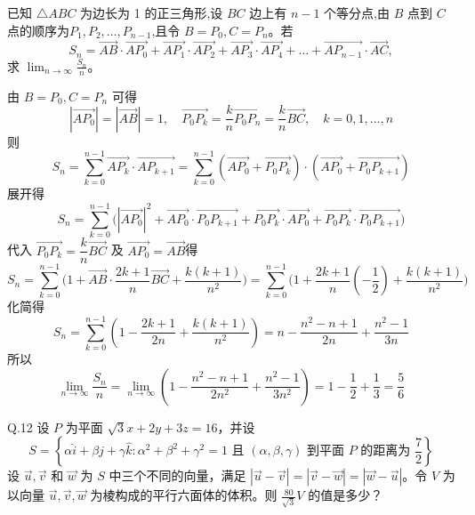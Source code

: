 \begin{questions}
    \question 已知 $\triangle ABC$ 为边长为 1 的正三角形,设 $BC$ 边上有 $n-1$ 个等分点,由 $B$ 点到 $C$ 点的顺序为$P_1, P_2, \dots, P_{n-1}$,且令 $B=P_0, C=P_n$。若
    \[
    S_n = \overrightarrow{AB} \cdot \overrightarrow{AP_0} + \overrightarrow{AP_1} \cdot \overrightarrow{AP_2} + \overrightarrow{AP_3} \cdot \overrightarrow{AP_4} + \dots + \overrightarrow{AP_{n-1}} \cdot \overrightarrow{AC},
    \]
    求 $\displaystyle \lim_{n \to \infty} \frac{S_n}{n}$。
    \begin{solution}
        由 $B=P_0, C=P_n$ 可得
        \[
        |\overrightarrow{AP_0}| = |\overrightarrow{AB}| =1, \quad 
        \overrightarrow{P_0P_k} = \frac{k}{n} \overrightarrow{P_0P_n} = \frac{k}{n}\overrightarrow{BC}, \quad k=0,1,\dots,n
        \]
        则
        \[
        S_n = \sum_{k=0}^{n-1} \overrightarrow{AP_k} \cdot \overrightarrow{AP_{k+1}}
        = \sum_{k=0}^{n-1} (\overrightarrow{AP_0} + \overrightarrow{P_0P_k}) \cdot (\overrightarrow{AP_0} + \overrightarrow{P_0P_{k+1}})
        \]
        展开得
        \[
        S_n = \sum_{k=0}^{n-1} \Big( |\overrightarrow{AP_0}|^2 + \overrightarrow{AP_0} \cdot \overrightarrow{P_0P_{k+1}} + \overrightarrow{P_0P_k} \cdot \overrightarrow{AP_0} + \overrightarrow{P_0P_k} \cdot \overrightarrow{P_0P_{k+1}} \Big)
        \]
        代入 $\overrightarrow{P_0P_k} = \dfrac{k}{n} \overrightarrow{BC}$ 及 $\overrightarrow{AP_0} = \overrightarrow{AB}$得
        \[
        S_n = \sum_{k=0}^{n-1} \Big( 1 + \overrightarrow{AB} \cdot \frac{2k+1}{n} \overrightarrow{BC} + \frac{k(k+1)}{n^2} \Big)
        = \sum_{k=0}^{n-1} \Big( 1 + \frac{2k+1}{n}\left(-\frac{1}{2}\right) + \frac{k(k+1)}{n^2} \Big)
        \]
        化简得
        \[
        S_n = \sum_{k=0}^{n-1} \left(1 - \frac{2k+1}{2n} + \frac{k(k+1)}{n^2}\right)
        = n - \frac{n^2 - n +1}{2n} + \frac{n^2 -1}{3n}
        \]
        所以
        \[
        \lim_{n \to \infty} \frac{S_n}{n} = \lim_{n \to \infty} \left( 1 - \frac{n^2 - n +1}{2n^2} + \frac{n^2 -1}{3n^2} \right)
        = 1 - \frac{1}{2} + \frac{1}{3} = \frac{5}{6}
        \]
    \end{solution}
    \question
Q.12 设 $P$ 为平面 $\sqrt{3}x + 2y + 3z = 16$，并设
\[ S = \left\{ \alpha \hat{i} + \beta \hat{j} + \gamma \hat{k} : \alpha^2 + \beta^2 + \gamma^2 = 1 \text{ 且 } (\alpha, \beta, \gamma) \text{ 到平面 } P \text{ 的距离为 } \frac{7}{2} \right\} \]
设 $\vec{u}, \vec{v}$ 和 $\vec{w}$ 为 $S$ 中三个不同的向量，满足 $|\vec{u}-\vec{v}| = |\vec{v}-\vec{w}| = |\vec{w}-\vec{u}|$。令 $V$ 为以向量 $\vec{u}, \vec{v}, \vec{w}$ 为棱构成的平行六面体的体积。则 $\frac{80}{\sqrt{3}}V$ 的值是多少？


\end{questions}
